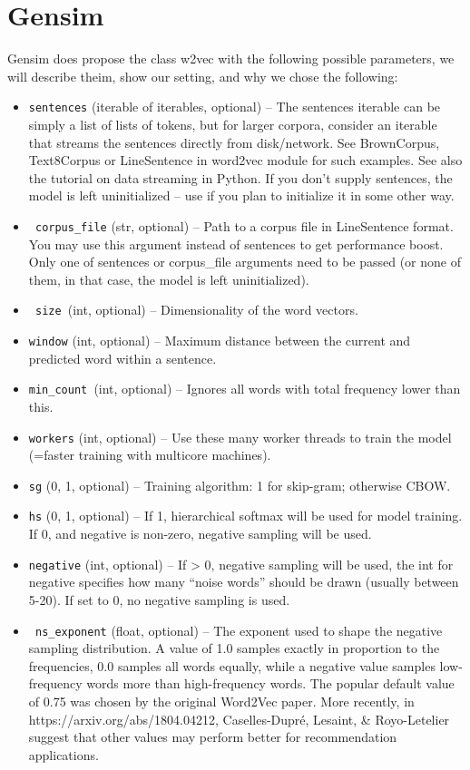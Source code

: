 \section{Gensim}
Gensim does propose the class w2vec with the following possible parameters, we will describe theim, show our setting, and why we chose the following: 
\begin{itemize}

   \item \texttt{sentences} (iterable of iterables, optional) – The sentences iterable can be simply a list of lists of tokens, but for larger corpora, consider an iterable that streams the sentences directly from disk/network. See BrownCorpus, Text8Corpus or LineSentence in word2vec module for such examples. See also the tutorial on data streaming in Python. If you don’t supply sentences, the model is left uninitialized – use if you plan to initialize it in some other way.
 \item  \texttt{ corpus\_file} (str, optional) – Path to a corpus file in LineSentence format. You may use this argument instead of sentences to get performance boost. Only one of sentences or corpus\_file arguments need to be passed (or none of them, in that case, the model is left uninitialized).
  \item \texttt{ size }(int, optional) – Dimensionality of the word vectors.
\item    \texttt{window} (int, optional) – Maximum distance between the current and predicted word within a sentence.
  \item  \texttt{min\_count }(int, optional) – Ignores all words with total frequency lower than this.
 \item   \texttt{workers} (int, optional) – Use these many worker threads to train the model (=faster training with multicore machines).
\item    \texttt{sg} ({0, 1}, optional) – Training algorithm: 1 for skip-gram; otherwise CBOW.
  \item  \texttt{hs} ({0, 1}, optional) – If 1, hierarchical softmax will be used for model training. If 0, and negative is non-zero, negative sampling will be used.
  \item  \texttt{negative} (int, optional) – If > 0, negative sampling will be used, the int for negative specifies how many “noise words” should be drawn (usually between 5-20). If set to 0, no negative sampling is used.
\item   \texttt{ ns\_exponent} (float, optional) – The exponent used to shape the negative sampling distribution. A value of 1.0 samples exactly in proportion to the frequencies, 0.0 samples all words equally, while a negative value samples low-frequency words more than high-frequency words. The popular default value of 0.75 was chosen by the original Word2Vec paper. More recently, in https://arxiv.org/abs/1804.04212, Caselles-Dupré, Lesaint, \& Royo-Letelier suggest that other values may perform better for recommendation applications.

\end{itemize}
